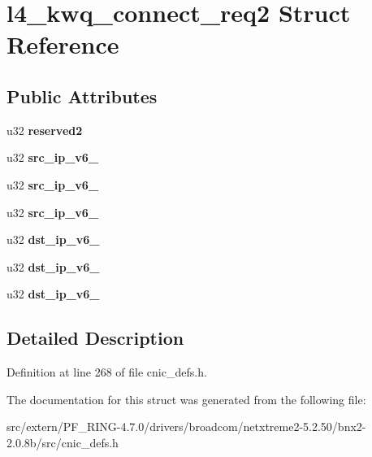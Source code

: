 \hypertarget{structl4__kwq__connect__req2}{
\section{l4\_\-kwq\_\-connect\_\-req2 Struct Reference}
\label{structl4__kwq__connect__req2}
}
\subsection*{Public Attributes}
\begin{DoxyCompactItemize}
\item 
\hypertarget{structl4__kwq__connect__req2_ab50c0477441acb3df3af5fd183328354}{
u32 {\bfseries reserved2}}
\label{structl4__kwq__connect__req2_ab50c0477441acb3df3af5fd183328354}

\item 
\hypertarget{structl4__kwq__connect__req2_aaaab71550fa847163845599f697c71f2}{
u32 {\bfseries src\_\-ip\_\-v6\_}}
\label{structl4__kwq__connect__req2_aaaab71550fa847163845599f697c71f2}

\item 
\hypertarget{structl4__kwq__connect__req2_aa9a96abba7e976e089b47d26c8255455}{
u32 {\bfseries src\_\-ip\_\-v6\_}}
\label{structl4__kwq__connect__req2_aa9a96abba7e976e089b47d26c8255455}

\item 
\hypertarget{structl4__kwq__connect__req2_ab67455d65a4e5a326a75d70a0790d84f}{
u32 {\bfseries src\_\-ip\_\-v6\_}}
\label{structl4__kwq__connect__req2_ab67455d65a4e5a326a75d70a0790d84f}

\item 
\hypertarget{structl4__kwq__connect__req2_a11592d9cd00eba4ec02c6d0a0f204620}{
u32 {\bfseries dst\_\-ip\_\-v6\_}}
\label{structl4__kwq__connect__req2_a11592d9cd00eba4ec02c6d0a0f204620}

\item 
\hypertarget{structl4__kwq__connect__req2_af4369898dbe42c82378b9ec4919433bc}{
u32 {\bfseries dst\_\-ip\_\-v6\_}}
\label{structl4__kwq__connect__req2_af4369898dbe42c82378b9ec4919433bc}

\item 
\hypertarget{structl4__kwq__connect__req2_a926a89766b7d1f61f0456bc5f7af729c}{
u32 {\bfseries dst\_\-ip\_\-v6\_}}
\label{structl4__kwq__connect__req2_a926a89766b7d1f61f0456bc5f7af729c}

\end{DoxyCompactItemize}


\subsection{Detailed Description}


Definition at line 268 of file cnic\_\-defs.h.



The documentation for this struct was generated from the following file:\begin{DoxyCompactItemize}
\item 
src/extern/PF\_\-RING-\/4.7.0/drivers/broadcom/netxtreme2-\/5.2.50/bnx2-\/2.0.8b/src/cnic\_\-defs.h\end{DoxyCompactItemize}
